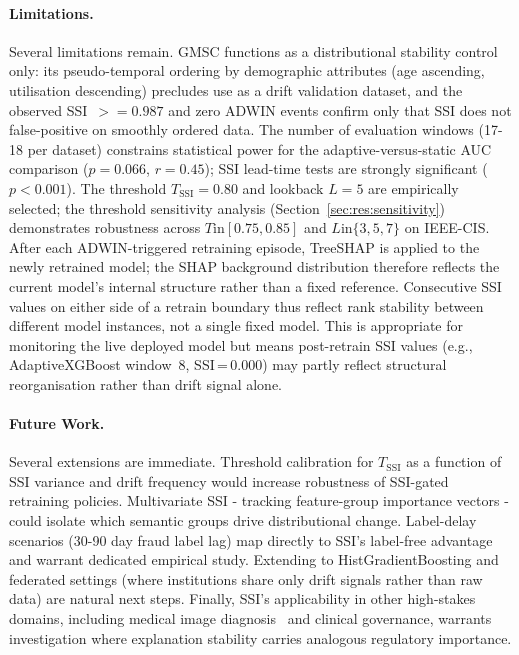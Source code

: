 \documentclass[pdflatex,sn-mathphys-num]{sn-jnl}
\theoremstyle{thmstyleone}
\theoremstyle{thmstyletwo}
\theoremstyle{thmstylethree}
\begin{document}
\paragraph{Limitations.}
Several limitations remain. GMSC functions as a
distributional stability control only: its pseudo-temporal ordering by
demographic attributes (age ascending, utilisation descending) precludes
use as a drift validation dataset, and the observed SSI~$\mathrel{>=} 0.987$ and
zero ADWIN events confirm only that SSI does not false-positive on smoothly
ordered data. The number of evaluation windows (17-18 per dataset)
constrains statistical power for the adaptive-versus-static AUC comparison
($p = 0.066$, $r = 0.45$); SSI lead-time tests are strongly significant
($p{<}0.001$). The threshold $T_{\mathrm{SSI}} = 0.80$ and lookback
$L = 5$ are empirically selected; the threshold sensitivity analysis
(Section~\ref{sec:res:sensitivity}) demonstrates robustness across
$T \mathbin{\mathrm{in}} [0.75, 0.85]$ and $L \mathbin{\mathrm{in}} \{3, 5, 7\}$ on IEEE-CIS. After each ADWIN-triggered retraining episode, TreeSHAP is applied to the
newly retrained model; the SHAP background distribution therefore reflects
the current model's internal structure rather than a fixed reference.
Consecutive SSI values on either side of a retrain boundary thus reflect
rank stability between different model instances, not a single fixed model.
This is appropriate for monitoring the live deployed model but means
post-retrain SSI values (e.g., AdaptiveXGBoost window~8, SSI\,=\,0.000)
may partly reflect structural reorganisation rather than drift signal alone.

\paragraph{Future Work.}
Several extensions are immediate. Threshold calibration for
$T_{\mathrm{SSI}}$ as a function of SSI variance and drift frequency would
increase robustness of SSI-gated retraining policies. Multivariate SSI -
tracking feature-group importance vectors - could isolate which semantic
groups drive distributional change. Label-delay scenarios (30-90 day fraud
label lag) map directly to SSI's label-free advantage and warrant dedicated
empirical study. Extending to HistGradientBoosting and federated settings
(where institutions share only drift signals rather than raw data) are natural
next steps. Finally, SSI's applicability in other high-stakes domains, including
medical image diagnosis~\cite{geetha2023skin} and clinical governance, warrants
investigation where explanation stability carries analogous regulatory importance.
\end{document}

